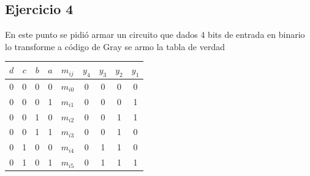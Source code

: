 \documentclass[a4paper]{article}
\begin{document}
\subsection*{Ejercicio 4}
En este punto se pidió armar un circuito que dados 4 bits de entrada en binario lo transforme a código de Gray  se armo la tabla de verdad 
\begin{table}[H]
\centering
\begin{tabular}{|c|c|c|c|c|c|c|c|c|}
\hline
\multicolumn{1}{|c|}{\textbf{$d$}} & \multicolumn{1}{c|}{\textbf{$c$}} & \multicolumn{1}{c|}{\textbf{$b$}} & \textbf{$a$} & \textbf{$m_{ij}$} & \multicolumn{1}{c|}{\textbf{$y_4$}} & \multicolumn{1}{c|}{\textbf{$y_3$}} & \multicolumn{1}{c|}{\textbf{$y_2$}} & \multicolumn{1}{c|}{\textbf{$y_1$}} \\ \hline
0                                  & 0                                 & 0                                 & 0            & \textbf{$m_{i0}$} & 0                                   & 0                                   & 0                                   & 0                                   \\ \cline{5-5}
0                                  & 0                                 & 0                                 & 1            & \textbf{$m_{i1}$} & 0                                   & 0                                   & 0                                   & 1                                   \\ \cline{5-5}
0                                  & 0                                 & 1                                 & 0            & \textbf{$m_{i2}$} & 0                                   & 0                                   & 1                                   & 1                                   \\ \cline{5-5}
0                                  & 0                                 & 1                                 & 1            & \textbf{$m_{i3}$} & 0                                   & 0                                   & 1                                   & 0                                   \\ \cline{5-5}
0                                  & 1                                 & 0                                 & 0            & \textbf{$m_{i4}$} & 0                                   & 1                                   & 1                                   & 0                                   \\ \cline{5-5}
0                                  & 1                                 & 0                                 & 1            & \textbf{$m_{i5}$} & 0                                   & 1                                   & 1                                   & 1                                   \\ \cline{5-5}

\end{tabular}
\end{table}
\end{document}
